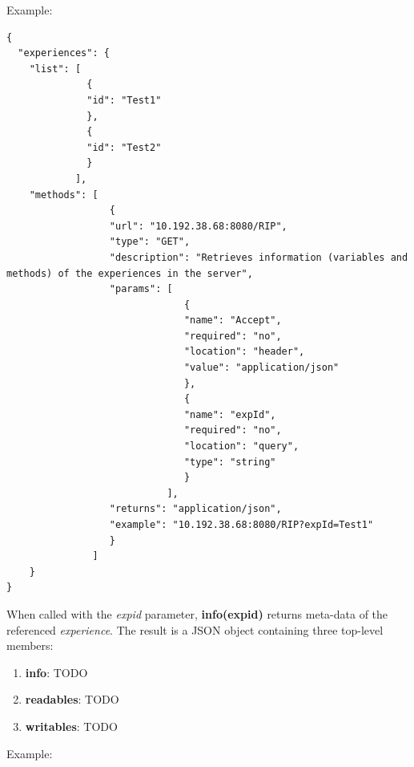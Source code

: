 Example:

\begin{lstlisting}
{
  "experiences": {
    "list": [
              {
              "id": "Test1"
              },
              {
              "id": "Test2"
              }
            ],
    "methods": [
                  {
                  "url": "10.192.38.68:8080/RIP",
                  "type": "GET",
                  "description": "Retrieves information (variables and methods) of the experiences in the server",
                  "params": [
                               {
                               "name": "Accept",
                               "required": "no",
                               "location": "header",
                               "value": "application/json"
                               },
                               {
                               "name": "expId",
                               "required": "no",
                               "location": "query",
                               "type": "string" 
                               }
                            ],
                  "returns": "application/json",
                  "example": "10.192.38.68:8080/RIP?expId=Test1"
                  }
               ]
    }
}
\end{lstlisting}

When called with the \textit{expid} parameter, \textbf{info(expid)} returns meta-data of the referenced \textit{experience}. The result is a JSON object containing three top-level members:

\begin{enumerate}
    \item \textbf{info}: TODO
    \item \textbf{readables}: TODO
    \item \textbf{writables}: TODO
\end{enumerate}

Example:

